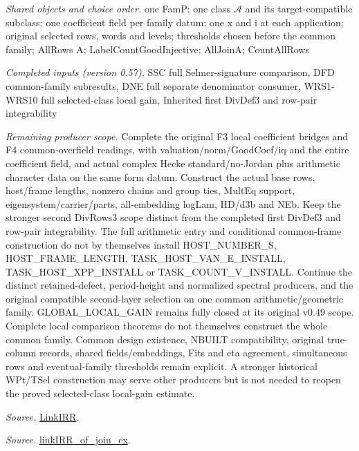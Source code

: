 \emph{Shared objects and choice order.} one FamP; one class $\mathcal A$ and its target-compatible subclass; one coefficient field per family datum; one x and i at each application; original selected rows, words and levels; thresholds chosen before the common family; AllRows A; LabelCountGoodInjective; AllJoinA; CountAllRows

\emph{Completed inputs (version 0.57).} SSC full Selmer-signature comparison, DFD common-family subresults, DNE full separate denominator consumer, WRS1-WRS10 full selected-class local gain, Inherited first DivDef3 and row-pair integrability

\emph{Remaining producer scope.} Complete the original F3 local coefficient bridges and F4 common-overfield readings, with valuation/norm/GoodCoef/iq and the entire coefficient field, and actual complex Hecke standard/no-Jordan plus arithmetic character data on the same form datum. Construct the actual base rows, host/frame lengths, nonzero chains and group ties, MultEq support, eigensystem/carrier/parts, all-embedding logLam, HD/d3b and NEb. Keep the stronger second DivRows3 scope distinct from the completed first DivDef3 and row-pair integrability. The full arithmetic entry and conditional common-frame construction do not by themselves install HOST\_\allowbreak NUMBER\_\allowbreak S, HOST\_\allowbreak FRAME\_\allowbreak LENGTH, TASK\_\allowbreak HOST\_\allowbreak VAN\_\allowbreak E\_\allowbreak INSTALL, TASK\_\allowbreak HOST\_\allowbreak XPP\_\allowbreak INSTALL or TASK\_\allowbreak COUNT\_\allowbreak V\_\allowbreak INSTALL. Continue the distinct retained-defect, period-height and normalized spectral producers, and the original compatible second-layer selection on one common arithmetic/geometric family. GLOBAL\_\allowbreak LOCAL\_\allowbreak GAIN remains fully closed at its original v0.49 scope. Complete local comparison theorems do not themselves construct the whole common family. Common design existence, NBUILT compatibility, original true-column records, shared fields/embeddings, Fits and eta agreement, simultaneous rows and eventual-family thresholds remain explicit. A stronger historical WPt/TSel construction may serve other producers but is not needed to reopen the proved selected-class local-gain estimate.

\emph{Source.} \href{https://github.com/CocoSgt/riemann-hypothesis-lean/blob/7cbf7a0c32fca1badf05931879a37c3f8a2b03b4/src/Formalism/SharpRestriction/GlobalTheoremInputs.lean#L55-L58}{LinkIRR}.

\emph{Source.} \href{https://github.com/CocoSgt/riemann-hypothesis-lean/blob/7cbf7a0c32fca1badf05931879a37c3f8a2b03b4/src/Development/AbelianVarietyTheory/Proofs/GlobalInterpolation/LinkIRROfJoinEx.lean#L17-L38}{linkIRR\_\allowbreak of\_\allowbreak join\_\allowbreak ex}.

